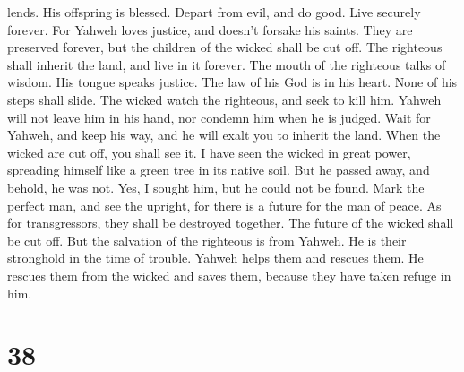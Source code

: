 lends. His offspring is blessed.  Depart from evil, and do
good. Live securely forever.  For Yahweh loves justice, and
doesn't forsake his saints. They are preserved forever, but the children
of the wicked shall be cut off.  The righteous shall
inherit the land, and live in it forever.  The mouth of the
righteous talks of wisdom. His tongue speaks justice.  The
law of his God is in his heart. None of his steps shall slide.
 The wicked watch the righteous, and seek to kill him.
 Yahweh will not leave him in his hand, nor condemn him
when he is judged.  Wait for Yahweh, and keep his way, and
he will exalt you to inherit the land. When the wicked are cut off, you
shall see it.  I have seen the wicked in great power,
spreading himself like a green tree in its native soil. 
But he passed away, and behold, he was not. Yes, I sought him, but he
could not be found.  Mark the perfect man, and see the
upright, for there is a future for the man of peace.  As
for transgressors, they shall be destroyed together. The future of the
wicked shall be cut off.  But the salvation of the
righteous is from Yahweh. He is their stronghold in the time of trouble.
 Yahweh helps them and rescues them. He rescues them from
the wicked and saves them, because they have taken refuge in him.

\hypertarget{section-37}{%
\section{38}\label{section-37}}

